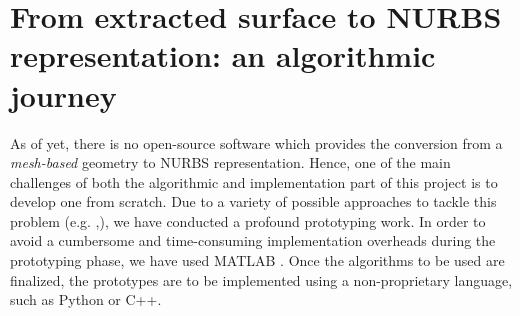 \section{From extracted surface to NURBS representation: an algorithmic journey}
As of yet, there is no open-source software which provides the conversion from a \textit{mesh-based} geometry to NURBS representation. Hence, one of the main challenges of both the algorithmic and implementation part of this project is to develop one from scratch. Due to a variety of possible approaches to tackle this problem (e.g. \cite{becker2011advanced},\cite{eck1996automatic}), we have conducted a profound prototyping work. In order to avoid a cumbersome and time-consuming implementation overheads during the prototyping phase, we have used MATLAB \cite{MATLAB}. Once the algorithms to be used are finalized, the prototypes are to be implemented using a non-proprietary language, such as Python or C++.




